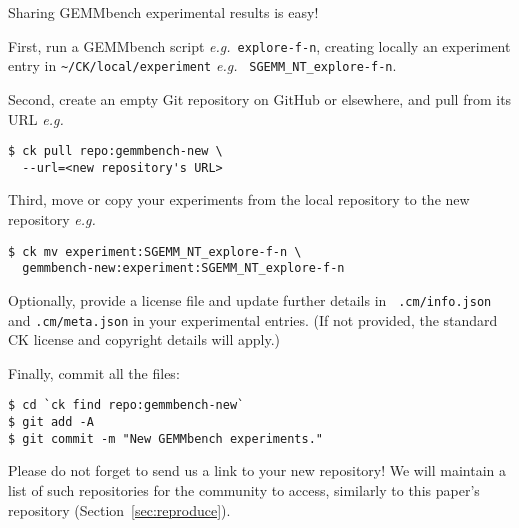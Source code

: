 \documentclass{acm_proc_article-sp} %
\begin{document}
Sharing GEMMbench experimental results is easy!

First, run a GEMMbench script {\em e.g.}\ {\tt explore-f-n}, creating locally
an experiment entry in \verb|~/CK/local/experiment| {\em e.g.} {\tt
SGEMM\_NT\_explore-f-n}.

Second, create an empty Git repository on GitHub or elsewhere, and pull from
its URL {\em e.g.}\
%
\begin{verbatim}
$ ck pull repo:gemmbench-new \
  --url=<new repository's URL>
\end{verbatim}
%

Third, move or copy your experiments from the local repository to the new repository {\em e.g.}\
%
\begin{verbatim}
$ ck mv experiment:SGEMM_NT_explore-f-n \
  gemmbench-new:experiment:SGEMM_NT_explore-f-n
\end{verbatim}
%

Optionally, provide a license file and update further details in {\tt
.cm/info.json} and {\tt .cm/meta.json} in your experimental entries.
%
(If not provided, the standard CK license and copyright details will apply.)

Finally, commit all the files:
%
\begin{verbatim}
$ cd `ck find repo:gemmbench-new`
$ git add -A
$ git commit -m "New GEMMbench experiments."
\end{verbatim}
%

Please do not forget to send us a link to your new repository! We will maintain a list
of such repositories for the community to access, similarly to this paper's
repository (Section~\ref{sec:reproduce}).

\balancecolumns
\end{document}
